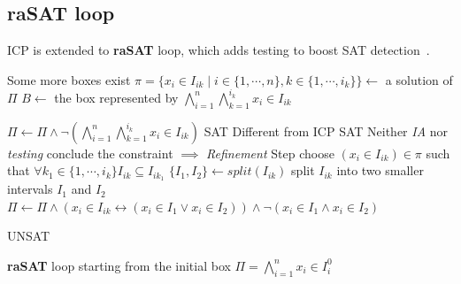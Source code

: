 \documentclass[runningheads,a4paper,oribibl]{llncs}
\begin{document}

\vspace{-1cm}


\subsection{raSAT loop}
ICP is extended to {\bf raSAT} loop, which adds testing to boost SAT detection~\cite{VanKhanh201227}.  
\begin{algorithm}[hb]
\begin{algorithmic}[1]
 \Comment Some more boxes exist
\State $\pi = \{x_i \in I_{ik} \mid i \in \{1,\cdots, n\}, k \in \{1,\cdots, i_k\} \} \gets $
a solution of $\Pi$ 	
\State $B \gets $ the box represented by
$\bigwedge\limits_{i=1}^n\bigwedge\limits_{k=1}^{i_k}x_i \in I_{ik}$

\State $\Pi \gets \Pi \wedge \neg(\bigwedge\limits_{i=1}^n\bigwedge\limits_{k=1}^{i_k}x_i \in I_{ik})$
\State \Return SAT
   \Comment Different from ICP
\State \Return SAT
\Else \Comment Neither \emph{IA} nor \emph{testing} conclude the constraint $\implies$
\emph{Refinement} Step
\State choose $(x_i \in I_{ik}) \in \pi$ such that $\forall k_1 \in \{1,\cdots, i_k\} I_{ik} \subseteq I_{ik_1}$
\State $\{I_1, I_2\} \gets split(I_{ik})$ \Comment split $I_{ik}$
into two smaller intervals $I_1$ and $I_2$
\State $\Pi \gets \Pi \wedge (x_i \in I_{ik} \leftrightarrow (x_i \in I_1 \vee x_i \in I_2))
\wedge \neg(x_i \in I_1 \wedge x_i \in I_2)$

\EndIf
\EndWhile
\State \Return UNSAT
\end{algorithmic}
\caption{\textbf{raSAT} loop starting from the initial box
  $\Pi = \bigwedge\limits_{i=1}^n x_i \in I_i^0$}
\label{Al:raSATLoop}
\end{algorithm}
\end{document}
